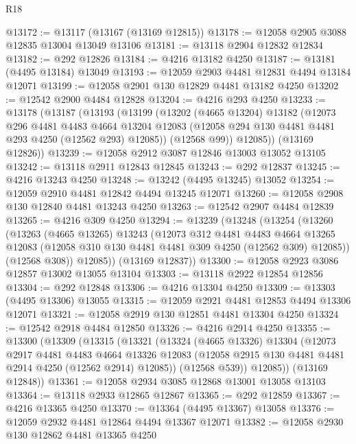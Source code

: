 \begin{lexlean}{R18}
\begin{coremodule}
@13172 := @13117 (@13167 (@13169 @12815))
@13178 := @12058 @2905 @3088 @12835 @13004 @13049 @13106
@13181 := @13118 @2904 @12832 @12834
@13182 := @292 @12826
@13184 := @4216 @13182 @4250
@13187 := @13181 (@4495 @13184) @13049
@13193 := @12059 @2903 @4481 @12831 @4494 @13184 @12071
@13199 := @12058 @2901 @130 @12829 @4481 @13182 @4250
@13202 := @12542 @2900 @4484 @12828
@13204 := @4216 @293 @4250
@13233 := @13178
    (@13187
      (@13193
        (@13199
          (@13202
            (@4665 @13204)
            @13182
            (@12073
              @296
              @4481
              @4483
              @4664
              @13204
              @12083
              (@12058 @294 @130 @4481 @4481 @293 @4250 (@12562 @293) @12085))
            (@12568 @99))
          @12085))
      (@13169 @12826))
@13239 := @12058 @2912 @3087 @12846 @13003 @13052 @13105
@13242 := @13118 @2911 @12843 @12845
@13243 := @292 @12837
@13245 := @4216 @13243 @4250
@13248 := @13242 (@4495 @13245) @13052
@13254 := @12059 @2910 @4481 @12842 @4494 @13245 @12071
@13260 := @12058 @2908 @130 @12840 @4481 @13243 @4250
@13263 := @12542 @2907 @4484 @12839
@13265 := @4216 @309 @4250
@13294 := @13239
    (@13248
      (@13254
        (@13260
          (@13263
            (@4665 @13265)
            @13243
            (@12073
              @312
              @4481
              @4483
              @4664
              @13265
              @12083
              (@12058 @310 @130 @4481 @4481 @309 @4250 (@12562 @309) @12085))
            (@12568 @308))
          @12085))
      (@13169 @12837))
@13300 := @12058 @2923 @3086 @12857 @13002 @13055 @13104
@13303 := @13118 @2922 @12854 @12856
@13304 := @292 @12848
@13306 := @4216 @13304 @4250
@13309 := @13303 (@4495 @13306) @13055
@13315 := @12059 @2921 @4481 @12853 @4494 @13306 @12071
@13321 := @12058 @2919 @130 @12851 @4481 @13304 @4250
@13324 := @12542 @2918 @4484 @12850
@13326 := @4216 @2914 @4250
@13355 := @13300
    (@13309
      (@13315
        (@13321
          (@13324
            (@4665 @13326)
            @13304
            (@12073
              @2917
              @4481
              @4483
              @4664
              @13326
              @12083
              (@12058 @2915 @130 @4481 @4481 @2914 @4250 (@12562 @2914) @12085))
            (@12568 @539))
          @12085))
      (@13169 @12848))
@13361 := @12058 @2934 @3085 @12868 @13001 @13058 @13103
@13364 := @13118 @2933 @12865 @12867
@13365 := @292 @12859
@13367 := @4216 @13365 @4250
@13370 := @13364 (@4495 @13367) @13058
@13376 := @12059 @2932 @4481 @12864 @4494 @13367 @12071
@13382 := @12058 @2930 @130 @12862 @4481 @13365 @4250

\end{coremodule}
\end{lexlean}

